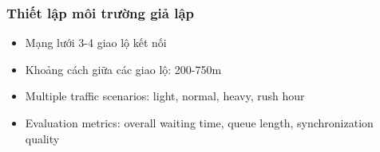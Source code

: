 \subsubsection{Thiết lập môi trường giả lập}
\begin{itemize}
    \item Mạng lưới 3-4 giao lộ kết nối

    \item Khoảng cách giữa các giao lộ: 200-750m

    \item Multiple traffic scenarios: light, normal, heavy, rush hour

    \item Evaluation metrics: overall waiting time, queue length,
        synchronization quality
\end{itemize}